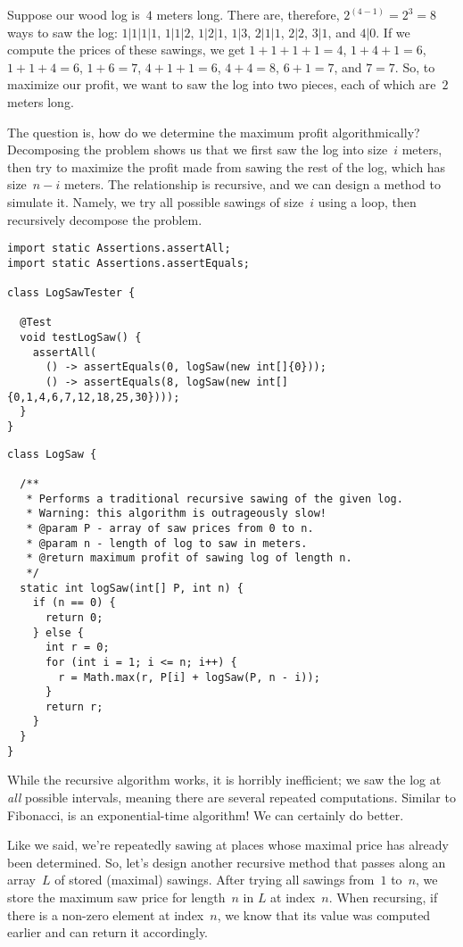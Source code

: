 Suppose our wood log is~$4$ meters long. 
There are, therefore, $2^(4-1)=2^3=8$ ways to saw the log:
$1|1|1|1$, $1|1|2$, $1|2|1$, $1|3$, $2|1|1$, $2|2$, $3|1$, and $4|0$. 
If we compute the prices of these sawings, we get $1+1+1+1=4$, $1+4+1=6$, $1+1+4=6$, $1+6=7$, $4+1+1=6$, $4+4=8$, $6+1=7$, and $7=7$. 
So, to maximize our profit, we want to saw the log into two pieces, each of which are~$2$ meters long.

The question is, how do we determine the maximum profit algorithmically? 
Decomposing the problem shows us that we first saw the log into size~$i$ meters, then try to maximize the profit made from sawing the rest of the log, which has size~$n - i$ meters. 
The relationship is recursive, and we can design a method to simulate it.
Namely, we try all possible sawings of size~$i$ using a loop, then recursively decompose the problem.

\begin{lstlisting}[language=MyJava]
import static Assertions.assertAll;
import static Assertions.assertEquals;

class LogSawTester {

  @Test
  void testLogSaw() {
    assertAll(
      () -> assertEquals(0, logSaw(new int[]{0}));
      () -> assertEquals(8, logSaw(new int[]{0,1,4,6,7,12,18,25,30})));
  }
}
\end{lstlisting}

\begin{lstlisting}[language=MyJava]
class LogSaw {
  
  /**
   * Performs a traditional recursive sawing of the given log.
   * Warning: this algorithm is outrageously slow!
   * @param P - array of saw prices from 0 to n.
   * @param n - length of log to saw in meters.
   * @return maximum profit of sawing log of length n.
   */
  static int logSaw(int[] P, int n) {
    if (n == 0) {
      return 0;
    } else {
      int r = 0;
      for (int i = 1; i <= n; i++) {
        r = Math.max(r, P[i] + logSaw(P, n - i));
      }
      return r;
    }
  }
}
\end{lstlisting}

While the recursive algorithm works, it is horribly inefficient; we saw the log at \emph{all} possible intervals, meaning there are several repeated computations. 
Similar to Fibonacci,  is an exponential-time algorithm! 
We can certainly do better.

Like we said, we're repeatedly sawing at places whose maximal price has already been determined.
So, let's design another recursive method that passes along an array~$L$ of stored (maximal) sawings.
After trying all sawings from~$1$ to~$n$, we store the maximum saw price for length~$n$ in $L$ at index~$n$.
When recursing, if there is a non-zero element at index~$n$, we know that its value was computed earlier and can return it accordingly.

